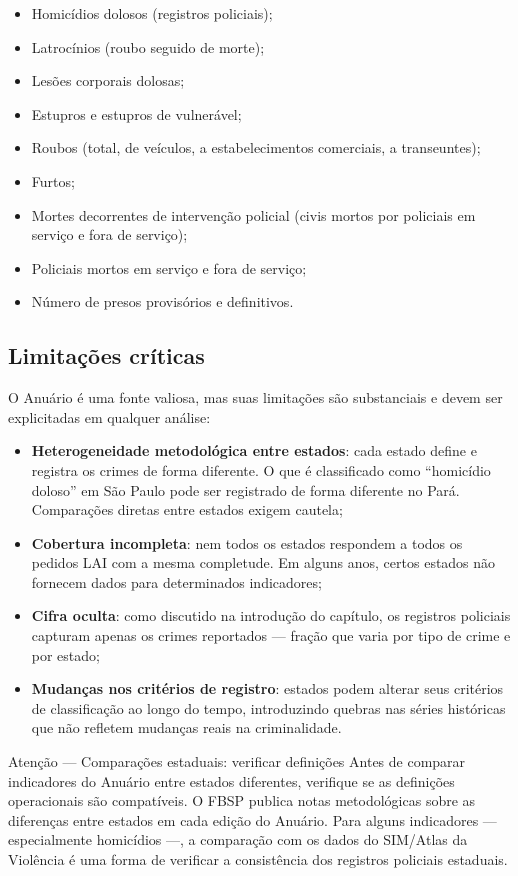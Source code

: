 \begin{itemize}
  \item Homicídios dolosos (registros policiais);
  \item Latrocínios (roubo seguido de morte);
  \item Lesões corporais dolosas;
  \item Estupros e estupros de vulnerável;
  \item Roubos (total, de veículos, a estabelecimentos comerciais, a transeuntes);
  \item Furtos;
  \item Mortes decorrentes de intervenção policial (civis mortos por policiais em serviço e fora de serviço);
  \item Policiais mortos em serviço e fora de serviço;
  \item Número de presos provisórios e definitivos.
\end{itemize}

\subsection{Limitações críticas}

O Anuário é uma fonte valiosa, mas suas limitações são substanciais e devem ser explicitadas em qualquer análise:

\begin{itemize}
  \item \textbf{Heterogeneidade metodológica entre estados}: cada estado define e registra os crimes de forma diferente. O que é classificado como ``homicídio doloso'' em São Paulo pode ser registrado de forma diferente no Pará. Comparações diretas entre estados exigem cautela;
  \item \textbf{Cobertura incompleta}: nem todos os estados respondem a todos os pedidos LAI com a mesma completude. Em alguns anos, certos estados não fornecem dados para determinados indicadores;
  \item \textbf{Cifra oculta}: como discutido na introdução do capítulo, os registros policiais capturam apenas os crimes reportados --- fração que varia por tipo de crime e por estado;
  \item \textbf{Mudanças nos critérios de registro}: estados podem alterar seus critérios de classificação ao longo do tempo, introduzindo quebras nas séries históricas que não refletem mudanças reais na criminalidade.
\end{itemize}

\begin{boxatencao}{Atenção --- Comparações estaduais: verificar definições}
Antes de comparar indicadores do Anuário entre estados diferentes, verifique se as definições operacionais são compatíveis. O FBSP publica notas metodológicas sobre as diferenças entre estados em cada edição do Anuário. Para alguns indicadores --- especialmente homicídios ---, a comparação com os dados do SIM/Atlas da Violência é uma forma de verificar a consistência dos registros policiais estaduais.
\end{boxatencao}

